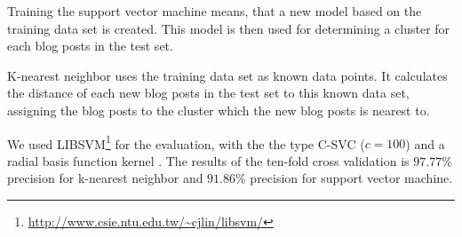 Training the support vector machine means, that a new model based on the training data set is created.
This model is then used for determining a cluster for each blog posts in the test set.


K-nearest neighbor uses the training data set as known data points.
It calculates the distance of each new blog posts in the test set to this known data set, assigning the blog posts to the cluster which the new blog posts is nearest to.


We used LIBSVM\footnote{\url{http://www.csie.ntu.edu.tw/~cjlin/libsvm/}} for the evaluation, with the the type C-SVC ($c=100$) and a radial basis function kernel \cite{fan2005working}.
The results of the ten-fold cross validation is $97.77\%$ precision for k-nearest neighbor and $91.86\%$ precision for support vector machine.
